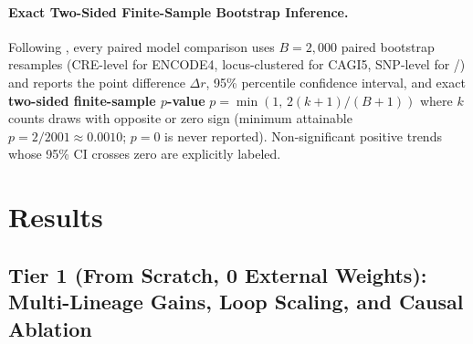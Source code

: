 \documentclass[10.5pt,a4paper]{article}
\begin{document}
\paragraph{Exact Two-Sided Finite-Sample Bootstrap Inference.}
Following \citet{phipson2010}, every paired model comparison uses $B=2{,}000$ paired bootstrap resamples (CRE-level for ENCODE4, locus-clustered for CAGI5, SNP-level for /) and reports the point difference $\Delta r$, 95\% percentile confidence interval, and exact \textbf{two-sided finite-sample $p$-value} $p = \min\!\left(1,\, 2(k+1)/(B+1)\right)$ where $k$ counts draws with opposite or zero sign (minimum attainable $p = 2/2001 \approx 0.0010$; $p=0$ is never reported). Non-significant positive trends whose 95\% CI crosses zero are explicitly labeled.

\section{Results}

\subsection{Tier 1 (From Scratch, 0 External Weights): Multi-Lineage Gains, Loop Scaling, and Causal Ablation}
\end{document}
